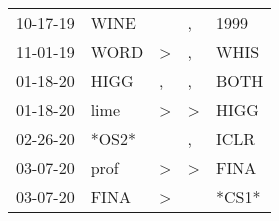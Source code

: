\begin{supertabular}{p{0.07\textwidth}p{0.06\textwidth}p{0.02\textwidth}p{0.02\textwidth}p{0.06\textwidth}}
          10-17-19\textsuperscript{} &           WINE\textsuperscript{} &                  &                , &           1999\textsuperscript{} \\
          11-01-19\textsuperscript{} &           WORD\textsuperscript{} &     \textgreater &                , &           WHIS\textsuperscript{} \\
          01-18-20\textsuperscript{} &           HIGG\textsuperscript{} &                , &                , &           BOTH\textsuperscript{} \\
          01-18-20\textsuperscript{} &           lime\textsuperscript{} &     \textgreater &     \textgreater &           HIGG\textsuperscript{} \\
          02-26-20\textsuperscript{} &                            *OS2* &                  &                , &           ICLR\textsuperscript{} \\
          03-07-20\textsuperscript{} &           prof\textsuperscript{} &     \textgreater &     \textgreater &           FINA\textsuperscript{} \\
          03-07-20\textsuperscript{} &           FINA\textsuperscript{} &     \textgreater &                  &                            *CS1* \\
\end{supertabular}
